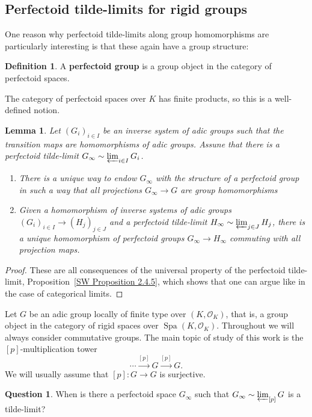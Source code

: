 \documentclass[10pt,oneside]{amsart}
\newtheorem{lemma}[theorem]{Lemma}
\theoremstyle{definition}
\newtheorem{definition}[theorem]{Definition}
\newtheorem{question}[theorem]{Question}
\newcommand{\Spa}{\operatorname{Spa}}
\renewcommand{\O}{\mathcal{O}}
\begin{document}
\subsection{Perfectoid tilde-limits for rigid groups}

One reason why perfectoid tilde-limits along group homomorphisms are particularly interesting is that these again have a group structure:

\begin{definition}
	A \textbf{perfectoid group} is a group object in the category of perfectoid spaces.
\end{definition}
The category of perfectoid spaces over $K$ has finite products, so this is a well-defined notion.

\begin{lemma}\label{perfectoid tilde-limit is perfectoid group in a functorial way}
	Let $(G_i)_{i\in I}$ be an inverse system of adic groups such that the transition maps are homomorphisms of adic groups. Assune that there is a perfectoid tilde-limit $G_\infty\sim \varprojlim_{i\in I}G_i$.
	\begin{enumerate}
		\item  There is a unique way to endow $G_\infty$ with the structure of a perfectoid group in such a way that all projections $G_\infty\rightarrow G$ are group homomorphisms
		\item Given a homomorphism of inverse systems of adic groups $(G_i)_{i\in I}\to (H_j)_{j\in J}$ and a perfectoid tilde-limit $H_\infty\sim\varprojlim_{j\in J}H_j$, there is a unique homomorphism of perfectoid groups $G_\infty\rightarrow H_\infty$
		commuting with all projection maps.
	\end{enumerate}
\end{lemma}
\begin{proof}
	These are all consequences of the universal property of the perfectoid tilde-limit, Proposition~\ref{SW Proposition 2.4.5}, which shows that one can argue like in the case of categorical limits.
\end{proof}

Let $G$ be an adic group locally of finite type over $(K,\O_K)$, that is, a group object in the category of rigid spaces over $\Spa(K,\O_K)$. Throughout we will always consider commutative groups. The main topic of study of this work is the $[p]$-multiplication tower
\[ \cdots\xrightarrow{[p]}G\xrightarrow{[p]}G.\]
We will usually assume that $[p]\colon G\to G$ is surjective.
\begin{question}\label{qu:tilde-limits-of-adic-groups}
	When is there a perfectoid space $G_\infty$ such that $G_\infty \sim \varprojlim_{[p]} G$ is a tilde-limit?
\end{question}
\end{document}
